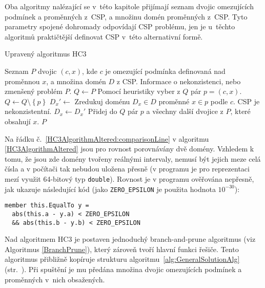 Oba algoritmy nalézající se v~této kapitole přijímají seznam dvojic omezujících podmínek a proměnných z~CSP, a množinu domén proměnných z~CSP. Tyto parametry spojené dohromady odpovídají CSP problému, jen je u~těchto algoritmů praktičtější definovat CSP v~této alternativní formě.

\begin{algorithm}
\caption{Upravený algoritmus HC3}
\label{HC3AlgorithmAltered}
\begin{algorithmic}[1]
\Require Seznam $P$ dvojic $(c, x)$, kde $c$ je omezující podmínka definovaná nad proměnnou $x$, a množina domén $D$ z CSP.
\Ensure Informace o nekonzistenci, nebo zmenšený problém $P$.
\State $Q \gets P$
\State Pomocí heuristiky vyber z $Q$ pár $p = (c, x)$. \label{HC3AlgorithmAltered:heuristicLine}
\State $Q \gets Q \setminus \left\{ p \right\}$
\State $D_x' \gets$ Zredukuj doménu $D_x \in D$ proměnné $x \in p$ podle $c$. \label{HC3AlgorithmAltered:reduce}
\State \Return CSP je nekonzistentní.
\EndIf
{} \label{HC3AlgorithmAltered:comparisonLine}
\State $D_x \gets D_x'$
\State Přidej do $Q$ pár $p$ a všechny další dvojice z $P$, které obsahují $x$.
\EndIf
\EndWhile
\State \Return $P$
\EndProcedure
\end{algorithmic}
\end{algorithm}

Na řádku č.~\ref{HC3AlgorithmAltered:comparisonLine} v algoritmu \ref{HC3AlgorithmAltered} jsou pro rovnost porovnávány dvě domény. Vzhledem k tomu, že jsou zde domény tvořeny reálnými intervaly, nemusí být jejich meze celá čísla a v počítači tak nebudou uložena přesně (v programu je pro reprezentaci mezí využit 64-bitový typ \verb|double|). Rovnost je v programu ověřována nepřesně, jak ukazuje následující kód (jako \verb|ZERO_EPSILON| je použita hodnota $10^{-30}$):

\begin{Verbatim}[samepage=true]
member this.EqualTo y =
  abs(this.a - y.a) < ZERO_EPSILON 
  && abs(this.b - y.b) < ZERO_EPSILON
\end{Verbatim}

Nad algoritmem HC3 je postaven jednoduchý branch-and-prune algoritmus (viz Algoritmus \ref{BranchPrune}), který zároveň tvoří hlavní funkci řešiče. Tento algoritmus přibližně kopíruje strukturu algoritmu~\ref{alg:GeneralSolutionAlg} (str.~\pageref{alg:GeneralSolutionAlg}). Při spuštění je mu předána množina dvojic omezujících podmínek a proměnných v~nich obsažených.

